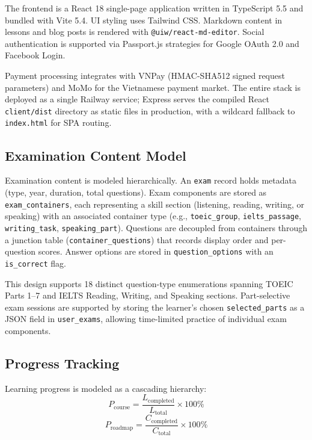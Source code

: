 \documentclass[conference]{IEEEtran}
\begin{document}
The frontend is a React 18 single-page application written in TypeScript 5.5 and bundled with Vite 5.4. UI styling uses Tailwind CSS. Markdown content in lessons and blog posts is rendered with \texttt{@uiw/react-md-editor}. Social authentication is supported via Passport.js strategies for Google OAuth 2.0 and Facebook Login.

Payment processing integrates with VNPay (HMAC-SHA512 signed request parameters) and MoMo for the Vietnamese payment market. The entire stack is deployed as a single Railway service; Express serves the compiled React \texttt{client/dist} directory as static files in production, with a wildcard fallback to \texttt{index.html} for SPA routing.

\subsection{Examination Content Model}
Examination content is modeled hierarchically. An \texttt{exam} record holds metadata (type, year, duration, total questions). Exam components are stored as \texttt{exam\_containers}, each representing a skill section (listening, reading, writing, or speaking) with an associated container type (e.g., \texttt{toeic\_group}, \texttt{ielts\_passage}, \texttt{writing\_task}, \texttt{speaking\_part}). Questions are decoupled from containers through a junction table (\texttt{container\_questions}) that records display order and per-question scores. Answer options are stored in \texttt{question\_options} with an \texttt{is\_correct} flag.

This design supports 18 distinct question-type enumerations spanning TOEIC Parts 1--7 and IELTS Reading, Writing, and Speaking sections. Part-selective exam sessions are supported by storing the learner's chosen \texttt{selected\_parts} as a JSON field in \texttt{user\_exams}, allowing time-limited practice of individual exam components.

\subsection{Progress Tracking}
Learning progress is modeled as a cascading hierarchy:
\begin{equation}
P_{\text{course}} = \frac{L_{\text{completed}}}{L_{\text{total}}} \times 100\%
\label{eq:prog_course}
\end{equation}
\begin{equation}
P_{\text{roadmap}} = \frac{C_{\text{completed}}}{C_{\text{total}}} \times 100\%
\label{eq:prog_roadmap}
\end{equation}
\end{document}
